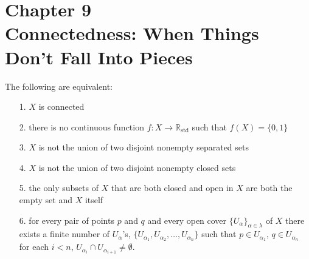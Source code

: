 \documentclass[a4paper,12pt,twoside]{hmcpset}
\begin{document}
\section*{Chapter 9\\ Connectedness: When Things Don't Fall Into Pieces}

\begin{problem}[Theorem 9.1]
    The following are equivalent:
    \begin{itemize}
        \item[1.] $X$ is connected 
        \item[2.] there is no continuous function $f: X \rightarrow
        \mathbb{R}_{\text{std}}$ such that $f(X) = \{0, 1\}$
        \item[3.] $X$ is not the union of two disjoint nonempty
        separated sets 
        \item[4.] $X$ is not the union of two disjoint nonempty
        closed sets
        \item[5.] the only subsets of $X$ that are both closed and
        open in $X$ are both the empty set and $X$ itself
        \item[6.] for every pair of points $p$ and $q$ and every open
        cover $\{U_{\alpha}\}_{\alpha \in \lambda}$ of $X$ there
        exists a finite number of $U_\alpha$'s, $\{U_{\alpha_1},
        U_{\alpha_2}, \dots, U_{\alpha_n}\}$ such that $p \in
        U_{\alpha_1}$, $q \in U_{\alpha_n}$ for each $i < n$, 
        $U_{\alpha_i} \cap U_{\alpha_{i + 1}} \ne \emptyset$.   
    \end{itemize}
\end{problem}
\end{document}
